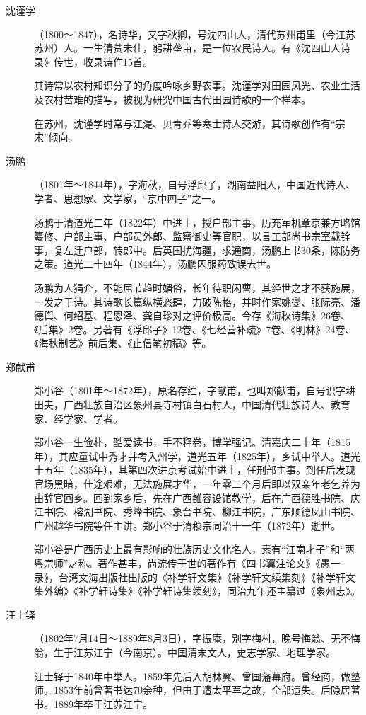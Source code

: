 \begin{description}
  \item[沈谨学] （1800～1847），名诗华，又字秋卿，号沈四山人，清代苏州甫里（今江苏苏州）人。一生清贫未仕，躬耕垄亩，是一位农民诗人。有《沈四山人诗录》传世，收录诗作15首。\par
        其诗常以农村知识分子的角度吟咏乡野农事。沈谨学对田园风光、农业生活及农村苦难的描写，被视为研究中国古代田园诗歌的一个样本。\par
        在苏州，沈谨学时常与江湜、贝青乔等寒士诗人交游，其诗歌创作有“宗宋”倾向。
  \item[汤鹏] （1801年～1844年），字海秋，自号浮邱子，湖南益阳人，中国近代诗人、学者、思想家、文学家，“京中四子”之一。\par
        汤鹏于清道光二年（1822年）中进士，授户部主事，历充军机章京兼方略馆纂修、户部主事、户部员外郎、监察御史等官职，以言工部尚书宗室载铨事，复左迁户部，转郎中。后英国扰海疆，求通商，汤鹏上书30条，陈防务之策。道光二十四年（1844年），汤鹏因服药致误去世。\par
        汤鹏为人狷介，不能屈节趋时媚俗，长年待职闲曹，其经世之才不获施展，一发之于诗。其诗歌长篇纵横恣肆，力破陈格，并时作家姚燮、张际亮、潘德舆、何绍基、程恩泽、龚自珍对之评价极高。今存《海秋诗集》26卷、《后集》2卷。另著有《浮邱子》12卷、《七经营补疏》7卷、《明林》24卷、《海秋制艺》前后集、《止信笔初稿》等。
  \item[郑献甫] 郑小谷（1801年～1872年），原名存纻，字献甫，也叫郑献甫，自号识字耕田夫，广西壮族自治区象州县寺村镇白石村人，中国清代壮族诗人、教育家、经学家、学者。\par
        郑小谷一生俭朴，酷爱读书，手不释卷，博学强记。清嘉庆二十年（1815年），其应童试中秀才并考入州学，道光五年（1825年），乡试中举人。道光十五年（1835年），其第四次进京考试始中进士，任刑部主事。到任后发现官场黑暗，仕途艰难，无法施展才华，一年零二个月后即以双亲年老乞养为由辞官回乡。回到家乡后，先在广西雒容设馆教学，后在广西德胜书院、庆江书院、榕湖书院、秀峰书院、象台书院、柳江书院，广东顺德凤山书院、广州越华书院等任主讲。郑小谷于清穆宗同治十一年（1872年）逝世。\par
        郑小谷是广西历史上最有影响的壮族历史文化名人，素有“江南才子”和“两粤宗师”之称。著作甚丰，尚流传于世的著作有《四书翼注论文》《愚一录》，台湾文海出版社出版的《补学轩文集》《补学轩文续集刻》《补学轩文集外编》《补学轩诗集》《补学轩诗集续刻》，同治九年还主纂过《象州志》。
  \item[汪士铎] （1802年7月14日～1889年8月3日），字振庵，别字梅村，晚号悔翁、无不悔翁，生于江苏江宁（今南京）。中国清末文人，史志学家、地理学家。\par
        汪士铎于1840年中举人。1859年先后入胡林翼、曾国藩幕府。曾经商，做塾师。1853年前曾著书达70余种，但由于遭太平军之故，全部遗失。后隐居著书。1889年卒于江苏江宁。\par

\end{description}
